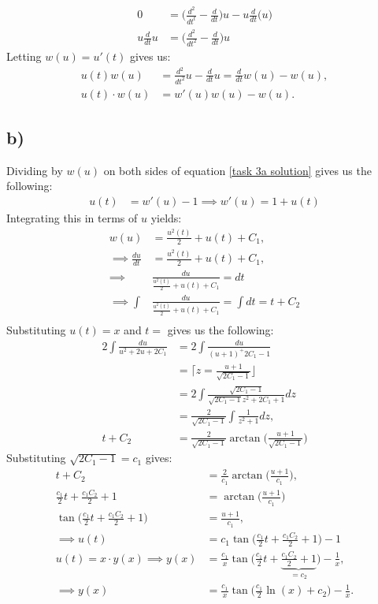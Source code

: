\documentclass[]{article}
\begin{document}
\begin{align*}
    0&=\Big(\frac{d^2}{dt^t} - \frac{d}{dt}\Big) u - u\frac{d}{dt}\big(u\big)\\
    u\frac{d}{dt}u&=\Big(\frac{d^2}{dt^2} - \frac{d}{dt}\Big)u
\end{align*}Letting $w(u) = u'(t)$ gives us:
\begin{align}
    u(t) w(u) &= \frac{d^2}{dt^2}u - \frac{d}{dt}u=\frac{d}{dt}w(u) - w(u),\nonumber\\
    u(t)\cdot w(u)&= w'(u)w(u) - w(u).\label{task 3a solution}
\end{align}

\subsection*{b)}
Dividing by $w(u)$ on both sides of equation \eqref{task 3a solution} gives us the following:
\begin{align*}
   u(t) &= w'(u) - 1 \implies w'(u)  = 1 +u(t)
\end{align*} Integrating this in terms of $u$ yields:
\begin{align*}
    w(u) &= \frac{u^2(t)}{2} + u(t) + C_1,\\
    \implies \frac{du}{dt} &= \frac{u^2(t)}{2} + u(t) + C_1,\\
    \implies& \frac{du}{\frac{u^2(t)}{2} + u(t) + C_1} = dt\\
    \implies \int& \frac{du}{\frac{u^2(t)}{2} + u(t) + C_1} = \int dt = t + C_2\\
\end{align*} Substituting $u(t) = x$ and $t = $ gives us the following:
\begin{align*}
    2\int \frac{du}{u^2 + 2u + 2C_1} &= 2 \int \frac{du}{(u+1)^ + 2C_1 - 1}\\
    &=\lceil z = \frac{u+1}{\sqrt{2C_1 -1}}\rfloor\\
    &=2\int \frac{\sqrt{2C_1 - 1}}{\sqrt{2C_1 - 1}z^2 + 2C_1 + 1}dz\\
    &=\frac{2}{\sqrt{2C_1 - 1}}\int\frac{1}{z^2 + 1}dz,\\
    t + C_2&= \frac{2}{\sqrt{2C_1 - 1}}\arctan\Big(\frac{u+1}{\sqrt{2C_1 - 1}}\Big)
\end{align*}Substituting $\sqrt{2C_1 - 1} = c_1$ gives:
\begin{align*}
    t + C_2 &= \frac{2}{c_1}\arctan\Big(\frac{u+1}{c_1}\Big),\\
    \frac{c_1}{2}t + \frac{c_1C_2}{2} + 1 &= \arctan\Big(\frac{u+1}{c_1}\Big)\\
    \tan\Big(\frac{c_1}{2}t + \frac{c_1C_2}{2} + 1\Big) &= \frac{u+1}{c_1},\\
    \implies u(t) &= c_1\tan\Big(\frac{c_1}{2}t + \frac{c_1C_2}{2} + 1\Big) - 1\\
    u(t) = x \cdot y(x)\implies y(x) &=\frac{c_1}{x}\tan\Big(\frac{c_1}{2}t + \underbrace{\frac{c_1C_2}{2} + 1}_{=c_2}\Big) - \frac{1}{x},\\
    \implies y(x) &= \frac{c_1}{x}\tan\Big(\frac{c_1}{2}\ln(x) + c_2\Big) - \frac{1}{x}.
\end{align*}
\end{document}

